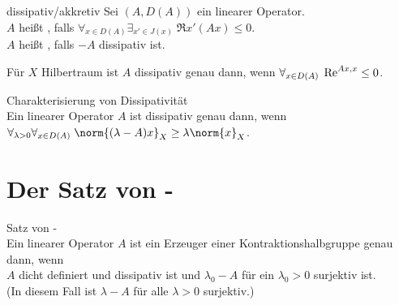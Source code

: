 \linie

\begin{Def}{dissipativ/akkretiv}
    Sei $(A, D(A))$ ein linearer Operator.\\
    $A$ heißt , falls
    $\forall_{x \in D(A)} \exists_{x' \in J(x)}\; \Re x'(Ax) \le 0$.\\
    $A$ heißt , falls $-A$ dissipativ ist.
\end{Def}

\begin{Bem}
    Für $X$ Hilbertraum ist $A$ dissipativ genau dann, wenn
    $\forall_{x \in D(A)}\; \Re \sp{Ax, x} \le 0$.
\end{Bem}


\linie

\begin{Satz}{Charakterisierung von Dissipativität}\\
    Ein linearer Operator $A$ ist dissipativ genau dann, wenn
    $\forall_{\lambda > 0} \forall_{x \in D(A)}\; \norm{(\lambda - A) x}_X \ge \lambda \norm{x}_X$.
\end{Satz}

\pagebreak

\section{%
    Der Satz von -%
}

\begin{Satz}{Satz von -}\\
    Ein linearer Operator $A$ ist ein Erzeuger einer Kontraktionshalbgruppe genau dann, wenn\\
    $A$ dicht definiert und dissipativ ist und
    $\lambda_0 - A$ für ein $\lambda_0 > 0$ surjektiv ist.\\
    (In diesem Fall ist $\lambda - A$ für alle $\lambda > 0$ surjektiv.)
\end{Satz}

\linie

